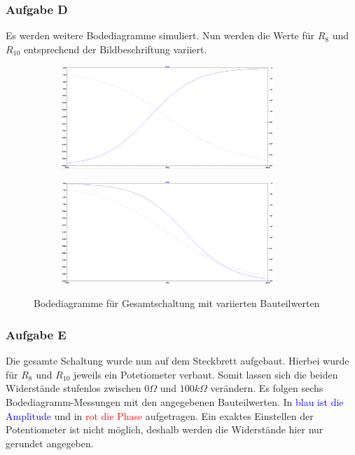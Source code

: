 \subsubsection{Aufgabe D}
\label{D}
Es werden weitere Bodediagramme simuliert. Nun werden die Werte für $R_{8}$ und $R_{10}$ entsprechend der Bildbeschriftung variiert.
\begin{figure}[h]
\centering
\begin{subfigure}{.5\textwidth}
  \centering
  \includegraphics[width=8cm]{pics/10_90}
  \centering  
  \label{Bode1090}
\end{subfigure}%
\begin{subfigure}{.5\textwidth}
  \centering
  \includegraphics[width=8cm]{pics/90_10}
  \centering
  \label{Bode9010}
\end{subfigure}
\caption{Bodediagramme für Gesamtschaltung mit variierten Bauteilwerten}
\end{figure}

\newpage
\subsubsection{Aufgabe E}
\label{E}
Die gesamte Schaltung wurde nun auf dem Steckbrett aufgebaut. Hierbei wurde für $R_{8}$ und $R_{10}$ jeweils ein Potetiometer verbaut. Somit lassen sich die beiden Widerstände stufenlos zwischen $\si{0}{\Omega}$ und $\si{100}{k\Omega}$ verändern. Es folgen sechs Bodediagramm-Messungen mit den angegebenen Bauteilwerten. In \textcolor{blue}{blau ist die Amplitude} und in \textcolor{red}{rot die Phase} aufgetragen. Ein exaktes Einstellen der Potentiometer ist nicht möglich, deshalb werden die Widerstände hier nur gerundet angegeben.

